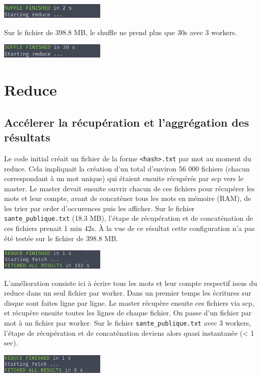 \documentclass[11pt,a4paper]{article}
\begin{document}
\includegraphics[width=5cm]{screenshot_shuffle5.png}

Sur le fichier de 398.8 MB, le shuffle ne prend plus que 30s avec 3 workers.

\includegraphics[width=5cm]{screenshot_shuffle6.png}


\section{Reduce}
\subsection*{Accélerer la récupération et l'aggrégation des résultats}
Le code initial créait un fichier de la forme \texttt{<hash>.txt} par mot au moment du reduce. Cela  impliquait la création d'un total d'environ 56 000 fichiers (chacun correspondant à un mot unique) qui étaient ensuite récupérés par scp vers le master. Le master devait ensuite ouvrir chacun de ces fichiers pour récupérer les mots et leur compte, avant de concaténer tous les mots en mémoire (RAM), de les trier par order d'occurences puis les afficher. Sur le fichier \texttt{sante\_publique.txt} (18.3 MB), l'étape de récupération et de concaténation de ces fichiers prenait 1 min 42s. À la vue de ce résultat cette configuration n'a pas été testée sur le fichier de 398.8 MB.

\includegraphics[width=5cm]{screenshot_reduce1.png}

L'amélioration consiste ici à écrire tous les mots et leur compte respectif issus du reduce dans un seul fichier par worker. Dans un premier temps les écritures sur disque sont faites ligne par ligne. Le master récupère ensuite ces fichiers via scp, et récupère ensuite toutes les lignes de chaque fichier. On passe d'un fichier par mot à un fichier par worker. Sur le fichier \texttt{sante\_publique.txt} avec 3 workers, l'étape de récupération et de concaténation deviens alors quasi instantanée (< 1 sec).

\includegraphics[width=5cm]{screenshot_reduce2.png}
\end{document}
